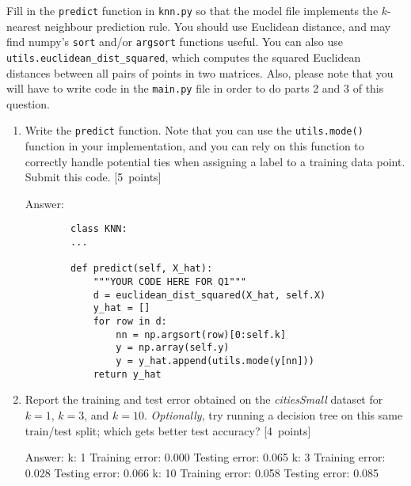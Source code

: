 \documentclass{article}
\newcommand{\blu}[1]{{\textcolor{blu}{#1}}}
\newcommand{\gre}[1]{\textcolor{gre}{#1}}
\newcommand\ans[1]{\par\gre{Answer: #1}}
\let\ask\blu
\newcommand\pts[1]{\textcolor{pointscolour}{[#1~points]}}
\begin{document}
    Fill in the \texttt{predict} function in \texttt{knn.py} so that the model file implements the $k$-nearest neighbour prediction rule.
    You should use Euclidean distance, and may find numpy's \texttt{sort} and/or \texttt{argsort} functions useful.
    You can also use \texttt{utils.euclidean\string_dist\string_squared}, which computes the squared Euclidean distances between all pairs of points in two matrices. Also, please note that you will have to write code in the \texttt{main.py} file in order to do parts 2 and 3 of this question.
    \begin{enumerate}
        \item Write the \texttt{predict} function. Note that you can use the \texttt{utils.mode()} function in your implementation, and you can rely on this function to correctly handle potential ties when assigning a label to a training data point. \ask{Submit this code.} \pts{5}
        \ans{}
        \begin{verbatim}
        class KNN:
        ...
    
        def predict(self, X_hat):
            """YOUR CODE HERE FOR Q1"""
            d = euclidean_dist_squared(X_hat, self.X)
            y_hat = []
            for row in d:
                nn = np.argsort(row)[0:self.k]
                y = np.array(self.y)
                y = y_hat.append(utils.mode(y[nn]))
            return y_hat
         \end{verbatim}
         \newpage
         
        \item \ask{Report the training and test error} obtained on the \emph{citiesSmall} dataset for $k=1$, $k=3$, and $k=10$. \emph{Optionally}, try running a decision tree on this same train/test split; which gets better test accuracy? \pts{4}
        \ans{\newline k: 1 \newline Training error: 0.000 \newline Testing error: 0.065 \newline\newline k: 3 \newline Training error: 0.028 \newline Testing error: 0.066 \newline\newline k: 10 \newline Training error: 0.058 \newline Testing error: 0.085}
        

\end{enumerate}
\end{document}
